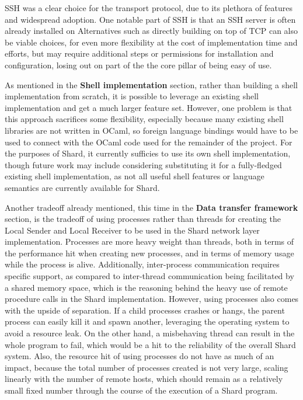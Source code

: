 \documentclass[twoside]{report}
\newcommand{\todoi}[1]{\todo[inline, color=blue!20]{TODO: {#1}}}
\begin{document}
SSH was a clear choice for the transport protocol, due to its plethora of features and widespread adoption.
One notable part of SSH is that an SSH server is often already installed on
Alternatives such as directly building on top of TCP can also be viable choices, for even more flexibility at the cost of implementation time and efforts, but may require additional steps or permissions for installation and configuration, losing out on part of the the core pillar of being easy of use.

As mentioned in the \textbf{Shell implementation} section, rather than building a shell implementation from scratch, it is possible to leverage an existing shell implementation and get a much larger feature set.
However, one problem is that this approach sacrifices some flexibility, especially because many existing shell libraries are not written in OCaml, so foreign language bindings would have to be used to connect with the OCaml code used for the remainder of the project.
For the purposes of Shard, it currently sufficies to use its own shell implementation, though future work may include considering substituting it for a fully-fledged existing shell implementation, as not all useful shell features or language semantics are currently available for Shard.
\todoi{Cite examples of existing shells as libraries}

Another tradeoff already mentioned, this time in the \textbf{Data transfer framework} section, is the tradeoff of using processes rather than threads for creating the Local Sender and Local Receiver to be used in the Shard network layer implementation.
Processes are more heavy weight than threads, both in terms of the performance hit when creating new processes, and in terms of memory usage while the process is alive.
Additionally, inter-process communication requires specific support, as compared to inter-thread communication being facilitated by a shared memory space, which is the reasoning behind the heavy use of remote procedure calls in the Shard implementation.
However, using processes also comes with the upside of separation.
If a child processes crashes or hangs, the parent process can easily kill it and spawn another, leveraging the operating system to avoid a resource leak.
On the other hand, a misbehaving thread can result in the whole program to fail, which would be a hit to the reliability of the overall Shard system.
Also, the resource hit of using processes do not have as much of an impact, because the total number of processes created is not very large, scaling linearly with the number of remote hosts, which should remain as a relatively small fixed number through the course of the execution of a Shard program.
\end{document}
